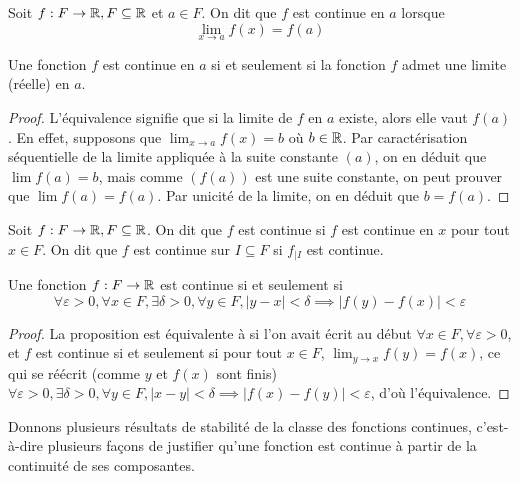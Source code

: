 \begin{defi}
    Soit $f : F\to\mathbb{R},F\subseteq\mathbb{R}$ et $a\in F$. On dit que $f$ est continue en $a$ lorsque $$\lim_{x\to a} f(x) = f(a)$$
\end{defi}

\begin{prop}
    Une fonction $f$ est continue en $a$ si et seulement si la fonction $f$ admet une limite (réelle) en $a$.
\end{prop}

\begin{proof}
    L'équivalence signifie que si la limite de $f$ en $a$ existe, alors elle vaut $f(a)$. En effet, supposons que $\lim_{x\to a} f(x) = b$ où $b\in \mathbb{R}$. Par caractérisation séquentielle de la limite appliquée à la suite constante $(a)$, on en déduit que $\lim f(a) = b$, mais comme $(f(a))$ est une suite constante, on peut prouver que $\lim f(a) = f(a)$. Par unicité de la limite, on en déduit que $b=f(a)$.
\end{proof}

\begin{defi}
    Soit $f : F\to\mathbb{R}, F\subseteq \mathbb{R}$. On dit que $f$ est continue si $f$ est continue en $x$ pour tout $x\in F$. On dit que $f$ est continue sur $I\subseteq F$ si $f_{|I}$ est continue.
\end{defi}

\begin{prop}
    Une fonction $f : F \to \mathbb{R}$ est continue si et seulement si $$\forall \varepsilon > 0, \forall x \in F, \exists \delta >0, \forall y\in F, |y-x| < \delta \implies |f(y)-f(x)| < \varepsilon$$
\end{prop}

\begin{proof}
    La proposition est équivalente à si l'on avait écrit au début $\forall x \in F, \forall\varepsilon > 0$, et $f$ est continue si et seulement si pour tout $x\in F$, $\displaystyle{\lim_{y\to x}f(y) = f(x)}$, ce qui se réécrit (comme $y$ et $f(x)$ sont finis) $\forall \varepsilon > 0, \exists \delta > 0,\forall y\in F, |x-y| < \delta \implies |f(x)-f(y)| < \varepsilon$, d'où l'équivalence.
\end{proof}

Donnons plusieurs résultats de stabilité de la classe des fonctions continues, c'est-à-dire plusieurs façons de justifier qu'une fonction est continue à partir de la continuité de ses composantes.

